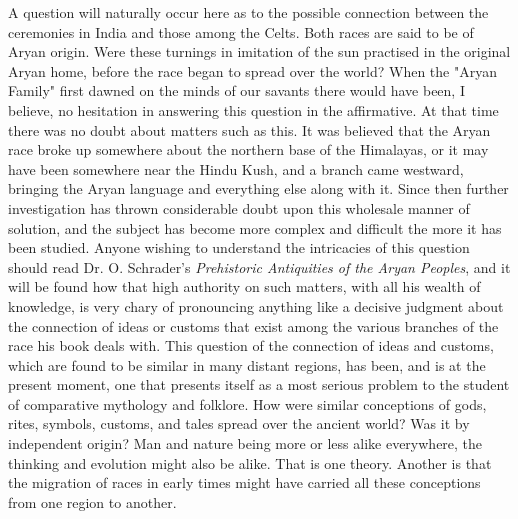 \documentclass[a4paper, 11pt, oneside, polutonikogreek, english]{article}
\begin{document}
A question will naturally occur here as to the possible connection between the ceremonies in India and those among the Celts. Both races are said to be of Aryan origin. Were these turnings in imitation of the sun practised in the original Aryan home, before the race began to spread over the world? When the "Aryan Family" first dawned on the minds of our savants there would have been, I believe, no hesitation in answering this question in the affirmative. At that time there was no doubt about matters such as this. It was believed that the Aryan race broke up somewhere about the northern base of the Himalayas, or it may have been somewhere near the Hindu Kush, and a branch came westward, bringing the Aryan language and everything else along with it. Since then further investigation has thrown considerable doubt upon this wholesale manner of solution, and the subject has become more complex and difficult the more it has been studied. Anyone wishing to understand the intricacies of this question should read Dr. O. Schrader's \emph{Prehistoric Antiquities of the Aryan Peoples}, and it will be found how that high authority on such matters, with all his wealth of knowledge, is very chary of pronouncing anything like a decisive judgment about the connection of ideas or customs that exist among the various branches of the race his book deals with. This question of the connection of ideas and customs, which are found to be similar in many distant regions, has been, and is at the present moment, one that presents itself as a most serious problem to the student of comparative mythology and folklore. How were similar conceptions of gods, rites, symbols, customs, and tales spread over the ancient world? Was it by independent origin? Man and nature being more or less alike everywhere, the thinking and evolution might also be alike. That is one theory. Another is that the migration of races in early times might have carried all these conceptions from one region to another.
\end{document}
